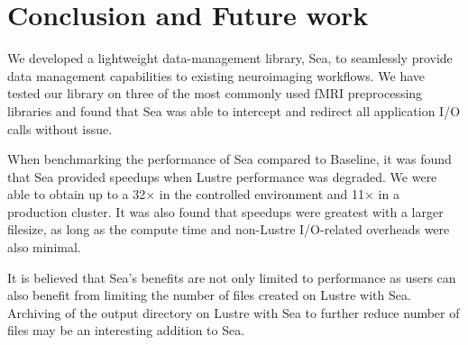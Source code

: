     
    
    \section{Conclusion and Future work}

    We developed a lightweight data-management library, Sea, to seamlessly
    provide data management capabilities to existing neuroimaging workflows. We
    have tested our library on three of the most commonly used fMRI
    preprocessing libraries and found that Sea was able to intercept and
    redirect all application I/O calls without issue. 

    When benchmarking the performance of Sea compared to Baseline, it was found that Sea provided speedups
    when Lustre performance was degraded. We were able to obtain up to a
    32$\times$ in the controlled environment and 11$\times$ in a production
    cluster. It was also found that speedups were greatest with a larger
    filesize, as long as the compute time and non-Lustre I/O-related overheads
    were also minimal.

    It is believed that Sea's benefits are not only limited to performance as
    users can also benefit from limiting the number of files created on Lustre
    with Sea. Archiving of the output directory on Lustre with Sea to further
    reduce number of files may be an interesting addition to Sea.